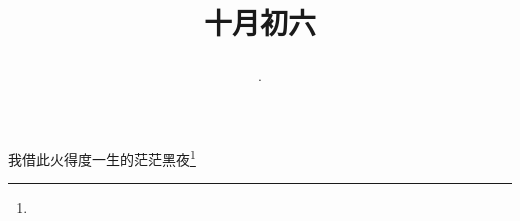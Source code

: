 \title{\date[d=6,m=11,y=2024][year:cn-y,年,month:cn,day:cn,日,·,weekday]·十月初六 }
我借此火得度一生的茫茫黑夜\footnote{ }

